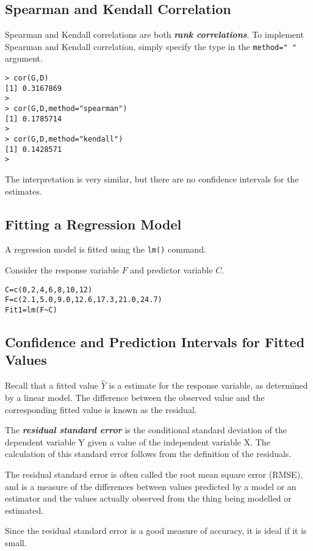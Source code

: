 \subsection{Spearman and Kendall Correlation}
Spearman and Kendall correlations are both \textbf{\emph{rank correlations}}. 
To implement Spearman and Kendall correlation, simply specify the type in the \texttt{method=" "} argument.
\begin{verbatim}
> cor(G,D)
[1] 0.3167869
>
> cor(G,D,method="spearman")
[1] 0.1785714
>
> cor(G,D,method="kendall")
[1] 0.1428571
> 
\end{verbatim}
The interpretation is very similar, but there are no confidence intervals for the estimates.

\subsection{Fitting a Regression Model}
A regression model is fitted using the \texttt{lm()} command.

Consider the response variable $F$ and predictor variable $C$.
\begin{framed}
\begin{verbatim}
C=c(0,2,4,6,8,10,12) 
F=c(2.1,5.0,9.0,12.6,17.3,21.0,24.7)
Fit1=lm(F~C)
\end{verbatim}
\end{framed}


\subsection{Confidence and Prediction Intervals for Fitted Values} 

Recall that a fitted value $\hat{Y}$ is a estimate for the response variable, as determined by a linear model. The difference between the observed value and the corresponding fitted value is known as the residual.

The \textbf{\emph{residual standard error}} is the conditional standard deviation of the dependent variable Y given a value of the independent variable X. The calculation of this standard error follows from the definition of the residuals.

The residual standard error is often called the root mean square error (RMSE), and is a measure of the differences between values predicted by a model or an estimator and the values actually observed from the thing being modelled or estimated.

Since the residual standard error is a good measure of accuracy, it is ideal if it is small.

